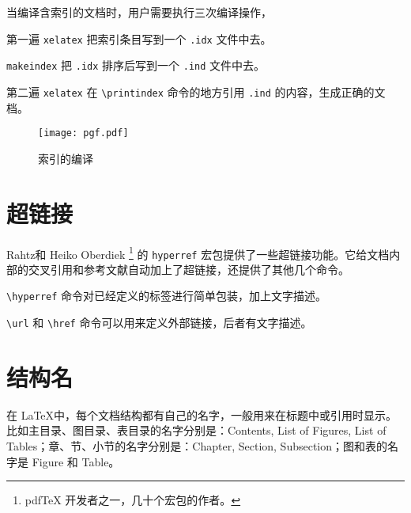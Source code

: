 当编译含索引的文档时，用户需要执行三次编译操作，

\begin{compactenum}
  \item 第一遍 \texttt{xelatex} 把索引条目写到一个 \texttt{.idx} 文件中去。
  \item \texttt{makeindex} 把 \texttt{.idx} 排序后写到一个 \texttt{.ind} 文件中去。
  \item 第二遍 \texttt{xelatex} 在 \verb|\printindex| 命令的地方引用 \texttt{.ind} 的内容，生成正确的文档。
\end{compactenum}

\begin{figure}[htbp]
\centering
\texttt{[image: pgf.pdf]}
\caption{索引的编译}
\label{fig:index}
\end{figure}

\section{超链接}
\label{sec:hyperlink}

Rahtz\indexRahtz 和 Heiko Oberdiek\indexOberdiek{} \footnote{pdfTeX 开发者之一，几十个宏包的作者。} 的 \texttt{hyperref} 宏包\citep{Rahtz_hyperref}提供了一些超链接功能。它给文档内部的交叉引用和参考文献自动加上了超链接，还提供了其他几个命令。

\verb|\hyperref| 命令对已经定义的标签进行简单包装，加上文字描述。

\begin{example}[htbp]
\caption{\texttt{\char`\\hyperref} 命令}
\label{exa:hyperref}
\end{example}

\verb|\url| 和 \verb|\href| 命令可以用来定义外部链接，后者有文字描述。

\begin{example}[htbp]
\caption{\texttt{\char`\\url} 和 \texttt{\char`\\href} 命令}
\label{exa:href}
\end{example}

\section{结构名}

在 \LaTeX 中，每个文档结构都有自己的名字，一般用来在标题中或引用时显示。比如主目录、图目录、表目录的名字分别是：Contents, List of Figures, List of Tables；章、节、小节的名字分别是：Chapter, Section, Subsection；图和表的名字是 Figure 和 Table。

